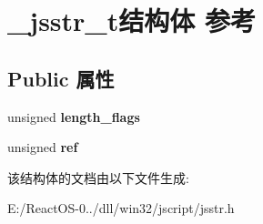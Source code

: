 \hypertarget{struct__jsstr__t}{}\section{\+\_\+jsstr\+\_\+t结构体 参考}
\label{struct__jsstr__t}
\subsection*{Public 属性}
\begin{DoxyCompactItemize}
\item 
\mbox{\label{struct__jsstr__t_a9ca057b87187a418e95ed40e5a709491}} 
unsigned {\bfseries length\+\_\+flags}
\item 
\mbox{\label{struct__jsstr__t_a2d02227f2eeb37f6b412b36df2567592}} 
unsigned {\bfseries ref}
\end{DoxyCompactItemize}


该结构体的文档由以下文件生成\+:\begin{DoxyCompactItemize}
\item 
E\+:/\+React\+O\+S-\/0../dll/win32/jscript/jsstr.\+h\end{DoxyCompactItemize}
